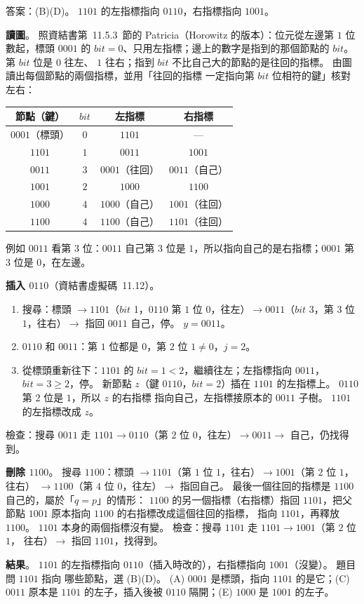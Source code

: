 \begin{pastsoln}
答案：(B)(D)。 $1101$ 的左指標指向 $0110$，右指標指向 $1001$。

\textbf{讀圖}。 照資結書第~11.5.3~節的 Patricia（Horowitz 的版本）：位元從左邊第 $1$ 位數起，標頭 $0001$ 的
$\mathit{bit} = 0$、只用左指標；邊上的數字是指到的那個節點的 $\mathit{bit}$。 第 $\mathit{bit}$ 位是 $0$ 往左、
$1$ 往右；指到 $\mathit{bit}$ 不比自己大的節點的是往回的指標。 由圖讀出每個節點的兩個指標，並用「往回的指標
一定指向第 $\mathit{bit}$ 位相符的鍵」核對左右：
\begin{center}
\small
\begin{tabular}{cccc}
\toprule
節點（鍵） & $\mathit{bit}$ & 左指標 & 右指標 \\
\midrule
$0001$（標頭） & $0$ & $1101$ & — \\
$1101$ & $1$ & $0011$ & $1001$ \\
$0011$ & $3$ & $0001$（往回） & $0011$（自己） \\
$1001$ & $2$ & $1000$ & $1100$ \\
$1000$ & $4$ & $1000$（自己） & $1001$（往回） \\
$1100$ & $4$ & $1100$（自己） & $1101$（往回） \\
\bottomrule
\end{tabular}
\end{center}
例如 $0011$ 看第 $3$ 位：$0011$ 自己第 $3$ 位是 $1$，所以指向自己的是右指標；$0001$ 第 $3$ 位是 $0$，在左邊。

\textbf{插入 $0110$}（資結書虛擬碼~11.12）。
\begin{enumerate}
\item 搜尋：標頭 $\to 1101$（$\mathit{bit}$ 1，$0110$ 第 $1$ 位 $0$，往左）$\to 0011$（$\mathit{bit}$ 3，第 $3$ 位
$1$，往右）$\to$ 指回 $0011$ 自己，停。 $y = 0011$。
\item $0110$ 和 $0011$：第 $1$ 位都是 $0$，第 $2$ 位 $1 \ne 0$，$j = 2$。
\item 從標頭重新往下：$1101$ 的 $\mathit{bit} = 1 < 2$，繼續往左；左指標指向 $0011$，$\mathit{bit} = 3 \ge 2$，停。
新節點 $z$（鍵 $0110$，$\mathit{bit} = 2$）插在 $1101$ 的左指標上。 $0110$ 第 $2$ 位是 $1$，所以 $z$ 的右指標
指向自己，左指標接原本的 $0011$ 子樹。 $1101$ 的左指標改成 $z$。
\end{enumerate}
檢查：搜尋 $0011$ 走 $1101 \to 0110$（第 $2$ 位 $0$，往左）$\to 0011 \to$ 自己，仍找得到。

\textbf{刪除 $1100$}。 搜尋 $1100$：標頭 $\to 1101$（第 $1$ 位 $1$，往右）$\to 1001$（第 $2$ 位 $1$，往右）
$\to 1100$（第 $4$ 位 $0$，往左）$\to$ 指回自己。 最後一個往回的指標是 $1100$ 自己的，屬於「$q = p$」的情形：
$1100$ 的另一個指標（右指標）指回 $1101$，把父節點 $1001$ 原本指向 $1100$ 的右指標改成這個往回的指標，
指向 $1101$，再釋放 $1100$。 $1101$ 本身的兩個指標沒有變。 檢查：搜尋 $1101$ 走 $1101 \to 1001$（第 $2$ 位 $1$，
往右）$\to$ 指回 $1101$，找得到。

\textbf{結果}。 $1101$ 的左指標指向 $0110$（插入時改的），右指標指向 $1001$（沒變）。 題目問 $1101$ 指向
哪些節點，選 (B)(D)。 (A) $0001$ 是標頭，指向 $1101$ 的是它；(C) $0011$ 原本是 $1101$ 的左子，插入後被 $0110$
隔開；(E) $1000$ 是 $1001$ 的左子。
\end{pastsoln}
